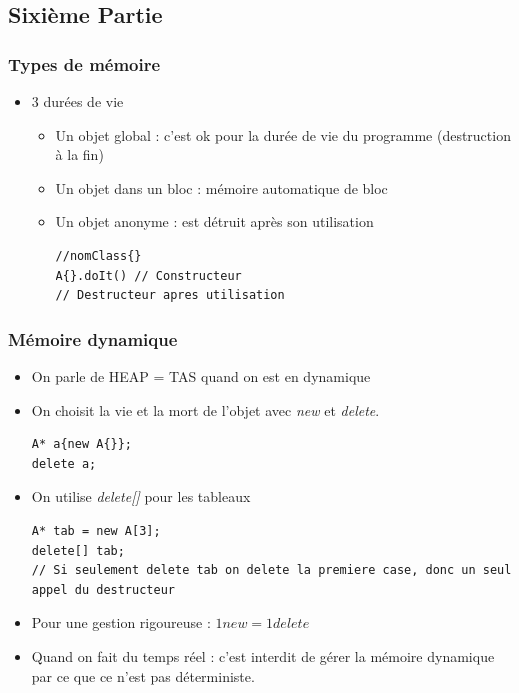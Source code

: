 \documentclass[12pt,a4paper]{article}
\begin{document}
\subsection{Sixième Partie}
\subsubsection{Types de mémoire}
\begin{itemize}
\item 3 durées de vie
\begin{itemize}
\item Un objet global : c'est ok pour la durée de vie du programme (destruction à la fin)
\item Un objet dans un bloc : mémoire automatique de bloc
\item Un objet anonyme : est détruit après son utilisation
\begin{lstlisting}
//nomClass{}
A{}.doIt() // Constructeur
// Destructeur apres utilisation
\end{lstlisting}
\end{itemize}
\end{itemize}
\subsubsection{Mémoire dynamique}
\begin{itemize}
\item On parle de HEAP = TAS quand on est en dynamique
\item On choisit la vie et la mort de l'objet avec \textit{new} et \textit{delete}.
\begin{lstlisting}
A* a{new A{}};
delete a;
\end{lstlisting}
\item On utilise \textit{delete[]} pour les tableaux
\begin{lstlisting}
A* tab = new A[3];
delete[] tab;
// Si seulement delete tab on delete la premiere case, donc un seul appel du destructeur
\end{lstlisting}
\item Pour une gestion rigoureuse : $1 new = 1 delete$
\item Quand on fait du temps réel : c'est interdit de gérer la mémoire dynamique par ce que ce n'est pas déterministe.
\end{itemize}
\end{document}
